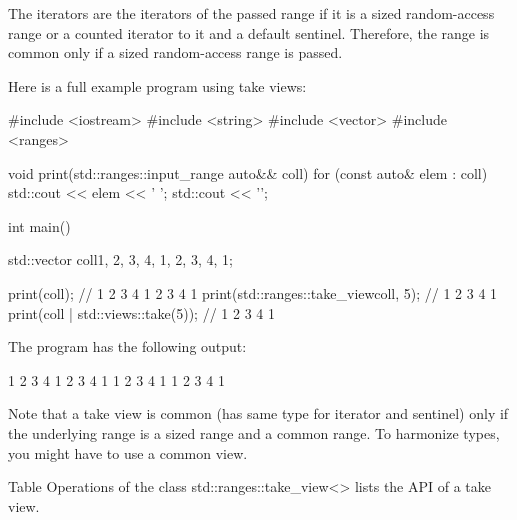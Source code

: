 The iterators are the iterators of the passed range if it is a sized random-access range or a counted iterator to it and a default sentinel. Therefore, the range is common only if a sized random-access range is passed.

Here is a full example program using take views:


\begin{cpp}
#include <iostream>
#include <string>
#include <vector>
#include <ranges>

void print(std::ranges::input_range auto&& coll)
{
	for (const auto& elem : coll) {
		std::cout << elem << ' ';
	}
	std::cout << '\n';
}

int main()
{
	std::vector coll{1, 2, 3, 4, 1, 2, 3, 4, 1};
	
	print(coll); // 1 2 3 4 1 2 3 4 1
	print(std::ranges::take_view{coll, 5}); // 1 2 3 4 1
	print(coll | std::views::take(5)); // 1 2 3 4 1
}
\end{cpp}

The program has the following output:

\begin{shell}
1 2 3 4 1 2 3 4 1
1 2 3 4 1
1 2 3 4 1
\end{shell}


Note that a take view is common (has same type for iterator and sentinel) only if the underlying range is a sized range and a common range. To harmonize types, you might have to use a common view.


Table Operations of the class std::ranges::take\_view<> lists the API of a take view.


